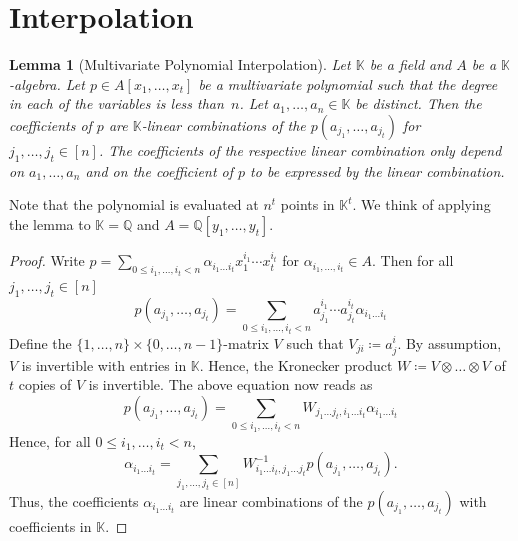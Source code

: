 \documentclass[10pt,a4paper]{article}
\theoremstyle{definition}
\theoremstyle{plain}
\newtheorem{lemma}[definition]{Lemma}
\theoremstyle{remark}
\begin{document}
	
	
	\section{Interpolation}
	
	\begin{lemma}[Multivariate Polynomial Interpolation] \label{lem:multivariate-polynomial-interpolation}
		Let $\mathbb{K}$ be a field and $A$ be a $\mathbb{K}$-algebra.
		Let $p \in A[x_1, \dots, x_t]$ be a multivariate polynomial such that the degree in each of the variables is less than~$n$.
		Let $a_1, \dots, a_n \in \mathbb{K}$ be distinct.
		Then the coefficients of $p$ are $\mathbb{K}$-linear combinations of the $p(a_{j_1}, \dots, a_{j_t})$ for $j_1, \dots, j_t \in [n]$. The coefficients of the respective linear combination only depend on $a_1, \dots, a_n$ and on the coefficient of $p$ to be expressed by the linear combination.
	\end{lemma}
	
	Note that the polynomial is evaluated at $n^t$ points in $\mathbb{K}^t$.
	We think of applying the lemma to $\mathbb{K} = \mathbb{Q}$ and $A = \mathbb{Q}[y_1,\dots, y_t]$.
	
	\begin{proof}
		Write $p = \sum_{0 \leq i_1,\dots, i_t < n} \alpha_{i_1\dots i_t} x^{i_1}_1 \cdots x^{i_t}_t$ 
		for $\alpha_{i_1,\dots, i_t} \in A$.
		Then for all $j_1, \dots, j_t \in [n]$
		\[
		p(a_{j_1}, \dots, a_{j_t}) = \sum_{0 \leq i_1,\dots, i_t < n}  a^{i_1}_{j_1} \cdots a^{i_t}_{j_t} \alpha_{i_1\dots i_t}
		\]
		Define the $\{1, \dots, n\} \times \{0, \dots, n-1\}$-matrix $V$ such that $V_{ji} \coloneqq a_{j}^i$.
		By assumption, $V$ is invertible with entries in $\mathbb{K}$.
		Hence, the Kronecker product $W \coloneqq V \otimes \dots \otimes V$ of $t$ copies of $V$  is invertible. 
		The above equation now reads as
		\[
		p(a_{j_1}, \dots, a_{j_t}) = \sum_{0 \leq i_1,\dots, i_t < n}  W_{j_1\dots j_t, i_1\dots i_t} \alpha_{i_1\dots i_t}
		\]
		Hence, for all $0 \leq i_1,\dots, i_t < n$,
		\[
		\alpha_{i_1\dots i_t} = \sum_{j_1, \dots, j_t \in [n]} W^{-1}_{i_1\dots i_t, j_1\dots j_t} p(a_{j_1}, \dots, a_{j_t}).
		\]
		Thus, the coefficients $\alpha_{i_1\dots i_t}$ are linear combinations of the $p(a_{j_1}, \dots, a_{j_t})$ with coefficients in $\mathbb{K}$.
	\end{proof}
	
\end{document}
